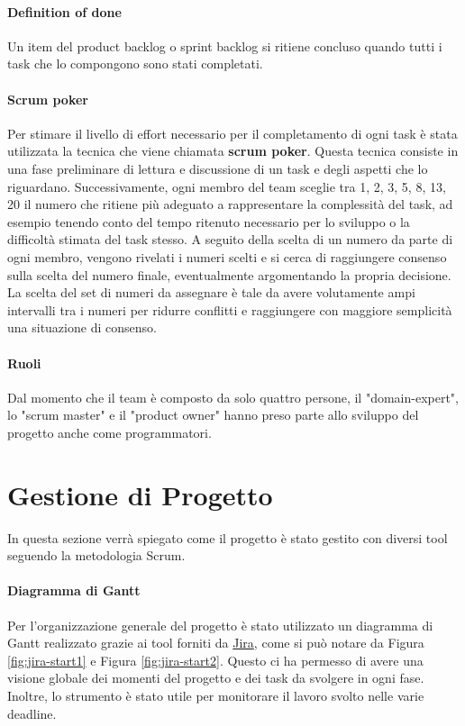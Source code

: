    \paragraph{Definition of done} Un item del product backlog o sprint backlog si ritiene concluso quando tutti i task che lo compongono sono stati completati.
    
    \paragraph{Scrum poker} Per stimare il livello di effort necessario per il completamento di ogni task è stata utilizzata la tecnica che viene chiamata \textbf{scrum poker}. Questa tecnica consiste in una fase preliminare di lettura e discussione di un task e degli aspetti che lo riguardano. Successivamente, ogni membro del team sceglie tra 1, 2, 3, 5, 8, 13, 20 il numero che ritiene più adeguato a rappresentare la complessità del task, ad esempio tenendo conto del tempo ritenuto necessario per lo sviluppo o la difficoltà stimata del task stesso. A seguito della scelta di un numero da parte di ogni membro, vengono rivelati i numeri scelti e si cerca di raggiungere consenso sulla scelta del numero finale, eventualmente argomentando la propria decisione. La scelta del set di numeri da assegnare è tale da avere volutamente ampi intervalli tra i numeri per ridurre conflitti e raggiungere con maggiore semplicità una situazione di consenso.

    \paragraph{Ruoli}
    Dal momento che il team è composto da solo quattro persone, il "domain-expert", lo "scrum master" e il "product owner" hanno preso parte allo sviluppo del progetto anche come programmatori.

\section{Gestione di Progetto}
In questa sezione verrà spiegato come il progetto è stato gestito con diversi tool seguendo la metodologia Scrum.
    \paragraph{Diagramma di Gantt} \label{par:gantt}
    Per l'organizzazione generale del progetto è stato utilizzato un diagramma di Gantt realizzato grazie ai tool forniti da \href{https://www.atlassian.com/software/jira}{Jira}, come si può notare da Figura \ref{fig:jira-start1} e Figura \ref{fig:jira-start2}. Questo ci ha permesso di avere una visione globale dei momenti del progetto e dei task da svolgere in ogni fase. Inoltre, lo strumento è stato utile per monitorare il lavoro svolto nelle varie deadline.

